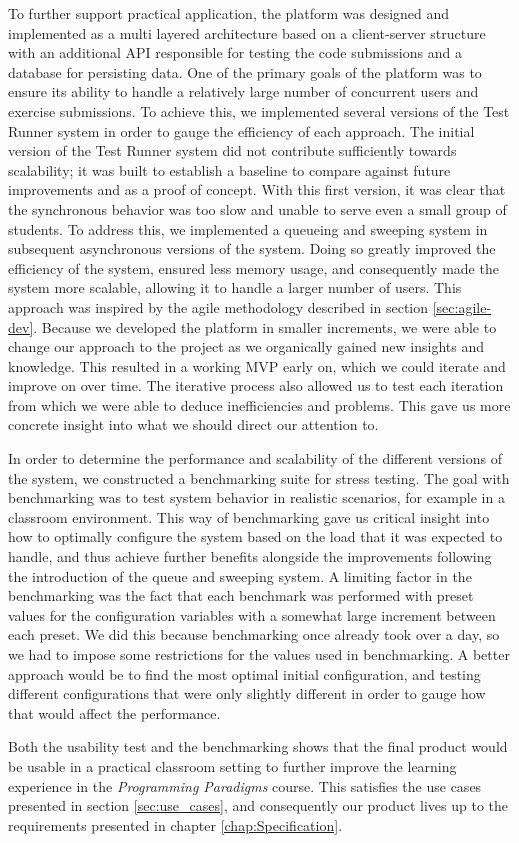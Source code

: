 To further support practical application, the platform was designed and implemented as a multi layered architecture based on a client-server structure with an additional API responsible for testing the code submissions and a database for persisting data.
One of the primary goals of the platform was to ensure its ability to handle a relatively large number of concurrent users and exercise submissions.
To achieve this, we implemented several versions of the Test Runner system in order to gauge the efficiency of each approach.
The initial version of the Test Runner system did not contribute sufficiently towards scalability; it was built to establish a baseline to compare against future improvements and as a proof of concept.
With this first version, it was clear that the synchronous behavior was too slow and unable to serve even a small group of students.
To address this, we implemented a queueing and sweeping system in subsequent asynchronous versions of the system.
Doing so greatly improved the efficiency of the system, ensured less memory usage, and consequently made the system more scalable, allowing it to handle a larger number of users.
This approach was inspired by the agile methodology described in section \ref{sec:agile-dev}.
Because we developed the platform in smaller increments, we were able to change our approach to the project as we organically gained new insights and knowledge.
This resulted in a working MVP early on, which we could iterate and improve on over time.
The iterative process also allowed us to test each iteration from which we were able to deduce inefficiencies and problems.
This gave us more concrete insight into what we should direct our attention to.

In order to determine the performance and scalability of the different versions of the system, we constructed a benchmarking suite for stress testing.
The goal with benchmarking was to test system behavior in realistic scenarios, for example in a classroom environment.
This way of benchmarking gave us critical insight into how to optimally configure the system based on the load that it was expected to handle, and thus achieve further benefits alongside the improvements following the introduction of the queue and sweeping system.
A limiting factor in the benchmarking was the fact that each benchmark was performed with preset values for the configuration variables with a somewhat large increment between each preset.
We did this because benchmarking once already took over a day, so we had to impose some restrictions for the values used in benchmarking.
A better approach would be to find the most optimal initial configuration, and testing different configurations that were only slightly different in order to gauge how that would affect the performance.

Both the usability test and the benchmarking shows that the final product would be usable in a practical classroom setting to further improve the learning experience in the \textit{Programming Paradigms} course.
This satisfies the use cases presented in section \ref{sec:use_cases}, and consequently our product lives up to the requirements presented in chapter \ref{chap:Specification}.